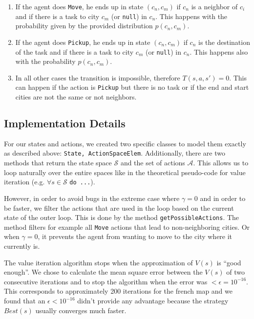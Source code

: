 \documentclass[11pt]{article}
\begin{document}
 \begin{enumerate}
   
\item 
If the agent does \texttt{Move},  
he ends up in state $(c_n, c_m)$ if $c_n$ is a neighbor of $c_i$ and if there is 
a task to city $c_m$ (or \texttt{null}) in $c_n$.
This happens with the probability  given by the provided distribution $p(c_n, c_m)$.

\item If the agent does \texttt{Pickup},  
he ends up in state $(c_n, c_m)$ if $c_n$ is the destination of the task and if there is 
a task to city $c_m$ (or \texttt{null}) in $c_n$.
This happens also with the probability $p(c_n, c_m)$.

\item 
In all other cases the transition is impossible, therefore $T(s, a, s') = 0$. 
This can happen if the action is \texttt{Pickup} but there is no task or if the 
end and start cities are not the same or not neighbors.

\end{enumerate}



\subsection{Implementation Details}
For our states and actions, we created two specific classes to model 
them exactly as described above: \texttt{State, ActionSpaceElem}.
Additionally, there are two methods that return the state space $\mathcal{S}$ and the set of 
actions $\mathcal{A}$. This allows us to loop naturally over the entire 
spaces like in the theoretical pseudo-code for value iteration 
(e.g. $\forall s \in \mathcal{S}$ \texttt{do ...}). 

However, in order to avoid bugs in the extreme case where $\gamma = 0$ 
and in order to be faster, we filter the actions that are used in the loop 
based on the current state of the outer loop. This is done by the 
method \texttt{getPossibleActions}. The method filters for 
example all \texttt{Move} actions that lead to non-neighboring cities. Or when
 $\gamma = 0$, it prevents the agent from wanting to move to the city 
where it currently is.

The value iteration algorithm stops when the approximation of $V(s)$ is ``good 
enough''.
We chose to calculate the mean square error between the $V(s)$ of two 
consecutive iterations and to stop the algorithm when the error was $ < 
\epsilon = 10^{-16}$. This corresponds to approximately 200 iterations for
the french map and we found that an $\epsilon < 10^{-16}$ didn't provide any 
advantage because the strategy $Best(s)$ usually converges much faster.
\end{document}
